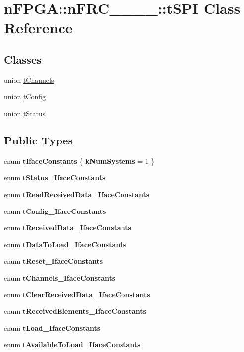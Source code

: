 \hypertarget{classnFPGA_1_1nFRC__2012__1__6__4_1_1tSPI}{
\section{nFPGA::nFRC\_\_\_\_::tSPI Class Reference}
\label{classnFPGA_1_1nFRC__2012__1__6__4_1_1tSPI}
}
\subsection*{Classes}
\begin{DoxyCompactItemize}
\item 
union \hyperlink{unionnFPGA_1_1nFRC__2012__1__6__4_1_1tSPI_1_1tChannels}{tChannels}
\item 
union \hyperlink{unionnFPGA_1_1nFRC__2012__1__6__4_1_1tSPI_1_1tConfig}{tConfig}
\item 
union \hyperlink{unionnFPGA_1_1nFRC__2012__1__6__4_1_1tSPI_1_1tStatus}{tStatus}
\end{DoxyCompactItemize}
\subsection*{Public Types}
\begin{DoxyCompactItemize}
\item 
enum {\bfseries tIfaceConstants} \{ {\bfseries kNumSystems} =  1
 \}
\item 
enum {\bfseries tStatus\_\-IfaceConstants} 
\item 
enum {\bfseries tReadReceivedData\_\-IfaceConstants} 
\item 
enum {\bfseries tConfig\_\-IfaceConstants} 
\item 
enum {\bfseries tReceivedData\_\-IfaceConstants} 
\item 
enum {\bfseries tDataToLoad\_\-IfaceConstants} 
\item 
enum {\bfseries tReset\_\-IfaceConstants} 
\item 
enum {\bfseries tChannels\_\-IfaceConstants} 
\item 
enum {\bfseries tClearReceivedData\_\-IfaceConstants} 
\item 
enum {\bfseries tReceivedElements\_\-IfaceConstants} 
\item 
enum {\bfseries tLoad\_\-IfaceConstants} 
\item 
enum {\bfseries tAvailableToLoad\_\-IfaceConstants} 
\end{DoxyCompactItemize}
